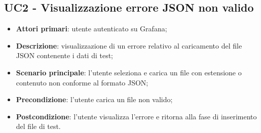 \subsection{UC2 - Visualizzazione errore JSON non valido}
\begin{itemize}
	\item \textbf{Attori primari}: utente autenticato su Grafana;
	\item \textbf{Descrizione}: visualizzazione di un errore relativo al caricamento del file JSON contenente i dati di test;
	\item \textbf{Scenario principale}: l'utente seleziona e carica un file con estensione o contenuto non conforme al formato JSON;
	\item \textbf{Precondizione}: l'utente carica un file non valido;
	\item \textbf{Postcondizione}: l'utente visualizza l'errore e ritorna alla fase di inserimento del file di test.
\end{itemize}
